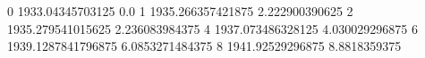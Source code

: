 0 1933.04345703125 0.0
1 1935.266357421875 2.222900390625
2 1935.279541015625 2.236083984375
4 1937.073486328125 4.030029296875
6 1939.1287841796875 6.0853271484375
8 1941.92529296875 8.8818359375
